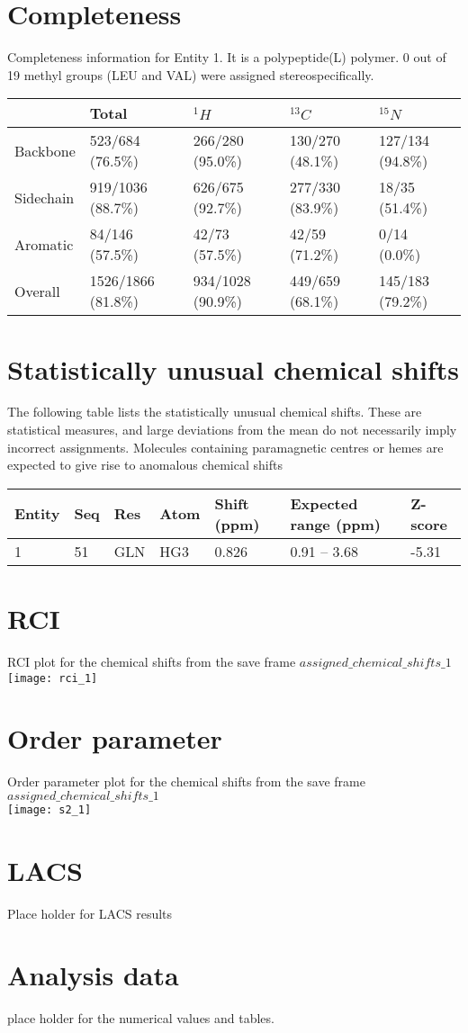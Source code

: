 \section{Completeness}
Completeness information for Entity 1. It is a polypeptide(L) polymer. 0 out of 19 methyl groups (LEU and VAL) were assigned stereospecifically.\begin{longtable}{|l|l|l|l|l|}
\hline
  & Total & $^{1}H$ & $^{13}C$ & $^{15}N$\\\hline
Backbone & 523/684 (76.5\%)& 266/280 (95.0\%)& 130/270 (48.1\%)& 127/134 (94.8\%) \\
\hline
Sidechain & 919/1036 (88.7\%)& 626/675 (92.7\%)& 277/330 (83.9\%)& 18/35 (51.4\%) \\
\hline
Aromatic & 84/146 (57.5\%)& 42/73 (57.5\%)& 42/59 (71.2\%)& 0/14 (0.0\%) \\
\hline
Overall & 1526/1866 (81.8\%)& 934/1028 (90.9\%)& 449/659 (68.1\%)& 145/183 (79.2\%) \\
\hline
\end{longtable}

\section{Statistically unusual chemical shifts}
The following table lists the statistically unusual chemical shifts. These are statistical measures, and large deviations from the mean do not necessarily imply incorrect assignments. Molecules containing paramagnetic centres or hemes are expected to give rise to anomalous chemical shifts\\\begin{longtable}{|l|l|l|l|l|l|l|}
\hline
Entity & Seq & Res & Atom & Shift (ppm) & Expected range (ppm) & Z-score\\\hline
1 & 51 & GLN & HG3 & 0.826 & 0.91 -- 3.68 & -5.31\\
\hline
\end{longtable}

\section{RCI}
RCI plot for the chemical shifts from the  save frame $assigned\_chemical\_shifts\_1$\\ \texttt{[image: rci\_1]}\\

\section{Order parameter}
Order parameter plot for the chemical shifts from the  save frame $assigned\_chemical\_shifts\_1$\\ \texttt{[image: s2\_1]}\\

\section{LACS}
Place holder for LACS results
\section{Analysis data}
place holder for the numerical values and tables.
